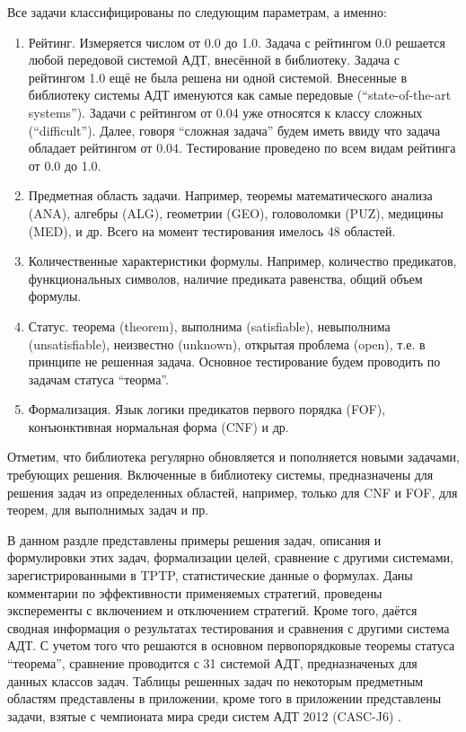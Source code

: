 Все задачи классифицированы по следующим параметрам, а именно:
\begin{enumerate}
\item {Рейтинг.} Измеряется числом от 0.0 до 1.0. Задача с рейтингом 0.0 решается любой передовой системой АДТ, внесённой в библиотеку. Задача с рейтингом 1.0 ещё не была решена ни одной системой. Внесенные в библиотеку системы АДТ именуются как  самые передовые (``state-of-the-art systems''). Задачи с рейтингом от 0.04 уже относятся к классу сложных (``difficult''). Далее, говоря ``сложная задача'' будем иметь ввиду что задача обладает рейтингом от 0.04. Тестирование проведено по всем видам рейтинга от 0.0 до 1.0.
\item {Предметная область задачи.} Например, теоремы математического анализа (ANA), алгебры (ALG), геометрии (GEO), головоломки (PUZ), медицины (MED), и др. Всего на момент тестирования имелось 48 областей.
\item {Количественные характеристики формулы.} Например, количество предикатов, функциональных символов, наличие предиката равенства, общий объем формулы.
\item {Статус.} теорема (theorem), выполнима (satisfiable), невыполнима (unsatisfiable), неизвестно (unknown), открытая проблема (open), т.е. в принципе не решенная задача. Основное тестирование будем проводить по задачам статуса ``теорма''.
\item {Формализация.} Язык логики предикатов первого порядка (FOF), конъюнктивная нормальная форма (CNF) и др.
\end{enumerate}

Отметим, что библиотека регулярно обновляется и пополняется новыми задачами, требующих решения. Включенные в библиотеку системы, предназначены для решения задач из определенных областей, например, только для CNF и FOF, для теорем, для выполнимых задач и пр.

В данном раздле представлены примеры решения задач, описания и формулировки этих задач, формализации целей, сравнение с другими системами, зарегистрированными в TPTP, статистические данные о формулах. Даны комментарии по эффективности применяемых стратегий, проведены эксперементы с включением и отключением стратегий. Кроме того, даётся сводная информация о результатах тестирования и сравнения с другими система АДТ. С учетом того что решаются в основном первопорядковые теоремы статуса ``теорема'', сравнение проводится с 31 системой АДТ, предназначеных для данных классов задач. Таблицы решенных задач по некоторым предметным областям представлены в приложении, кроме того в приложении представлены задачи, взятые с чемпионата мира среди систем АДТ 2012 (CASC-J6) \cite{CASC}.



